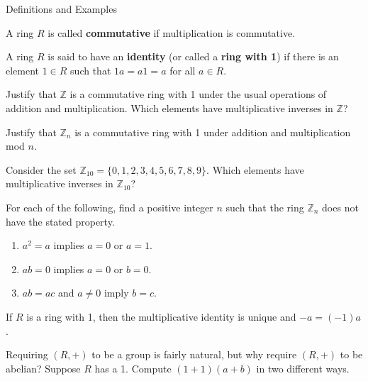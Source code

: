 \begin{section}{Definitions and Examples}
\begin{definition}
A ring $R$ is called \textbf{commutative} if multiplication is commutative.
\end{definition}

\begin{definition}
A ring $R$ is said to have an \textbf{identity} (or called a \textbf{ring with  1}) if there is an element $1\in R$ such that $1a=a 1=a$ for all $a\in R$.
\end{definition}

\begin{exercise}
Justify that $\mathbb{Z}$ is a commutative ring with 1 under the usual operations of addition and multiplication. Which elements have multiplicative inverses in $\mathbb{Z}$?
\end{exercise}

\begin{exercise}
Justify that $\mathbb{Z}_n$ is a commutative ring with 1 under addition and multiplication mod $n$.
\end{exercise}

\begin{exercise}\label{exer:Z10Ring}
Consider the set $\mathbb{Z}_{10}=\{0,1,2,3,4,5,6,7,8,9\}$. Which elements have multiplicative inverses in $\mathbb{Z}_{10}$?
\end{exercise}

\begin{exercise}
For each of the following, find a positive integer $n$ such that the ring $\mathbb{Z}_n$ does not have the stated property.
\begin{enumerate}[label=\rm{(\alph*)}]
\item $a^2=a$ implies $a=0$ or $a=1$.
\item $ab=0$ implies $a=0$ or $b=0$.
\item $ab=ac$ and $a\neq 0$ imply $b=c$.
\end{enumerate}
\end{exercise}

\begin{theorem}
If $R$ is a ring with 1, then the multiplicative identity is unique and $-a=(-1)a$.
\end{theorem}

\begin{problem}
Requiring $(R,+)$ to be a group is fairly natural, but why require $(R,+)$ to be abelian?  Suppose $R$ has a 1.  Compute $(1+1)(a+b)$ in two different ways.
\end{problem}


\end{section}
